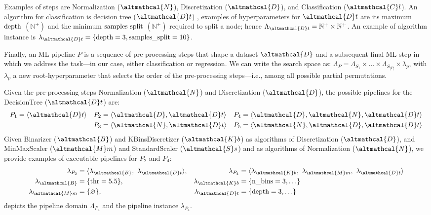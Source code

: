 \begin{example}
    Examples of steps are Normalization ($\altmathcal{N}$), Discretization ($\altmathcal{D}$), and Classification ($\altmathcal{C}l$).
    An algorithm for classification is decision tree  ($\altmathcal{D}t$) \cite{DBLP:books/wa/BreimanFOS84},
    examples of hyperparameters for $\altmathcal{D}t$ are its maximum $\textup{depth}$ $(\mathbb{N}^+)$ and the minimum $\textup{samples split}$ $(\mathbb{N}^+)$ required to split a node; hence $\Lambda_{\altmathcal{D}t} = \mathbb{N}^+ \times \mathbb{N}^+$.
    An example of algorithm instance is $\lambda_{\altmathcal{D}t}= \{ \textup{depth}=3,\textup{samples\_split}=10 \}$.
\end{example}

Finally, an ML pipeline $P$ is a sequence of pre-processing steps that shape a dataset $\altmathcal{D}$ and a subsequent final ML step in which we address the task---in our case, either classification or regression.
We can write the search space as: $\Lambda_P = \Lambda_{S_1} \times \ldots \times \Lambda_{S_{|P|}} \times \lambda_p$, with $\lambda_p$ a new root-hyperparameter that selects the order of the pre-processing steps---i.e., among all possible partial permutations.

\begin{example}[Pipeline]
    Given the pre-processing steps Normalization ($\altmathcal{N}$) and Discretization ($\altmathcal{D}$), the possible pipelines for the DecisionTree ($\altmathcal{D}t$) are:
    \begin{align*}
        P_1 &= \langle \altmathcal{D}t \rangle &
        P_2 &= \langle \altmathcal{D}, \altmathcal{D}t \rangle &
        P_4 &= \langle \altmathcal{D}, \altmathcal{N}, \altmathcal{D}t \rangle \\
        &&
        P_3 &= \langle \altmathcal{N}, \altmathcal{D}t \rangle & P_5 &= \langle \altmathcal{N}, \altmathcal{D}, \altmathcal{D}t \rangle
    \end{align*}
    Given \textup{Binarizer} ($\altmathcal{B}$) and  \textup{KBinsDiscretizer} ($\altmathcal{K}b$) as algorithms of Discretization ($\altmathcal{D}$), and \textup{MinMaxScaler} ($\altmathcal{M}m$) and \textup{StandardScaler} ($\altmathcal{S}s$) and  as algorithms of Normalization ($\altmathcal{N}$), we provide examples of executable pipelines for $P_2$ and $P_4$:
    \begin{align*}
        \lambda_{P_2} &= \langle \lambda_{\altmathcal{B}},~ \lambda_{\altmathcal{D}t} \rangle, &\lambda_{P_4} &= \langle \lambda_{\altmathcal{K}b},~ \lambda_{\altmathcal{M}m},~ \lambda_{\altmathcal{D}t} \rangle \\
        \lambda_{\altmathcal{B}}&=\{ \textup{thr}=5.5 \}, &\lambda_{\altmathcal{K}b}&=\{ \textup{n\_bins}=3, \ldots \}\\
        \lambda_{\altmathcal{M}m}&=\{ \varnothing \}, &\lambda_{\altmathcal{D}t}&= \{ \textup{depth}=3,\ldots\}
    \end{align*}
     depicts the pipeline domain $\Lambda_{P_4}$ and the pipeline instance $\lambda_{P_4}$.
    \label{ex:pipelineinstance}
    \end{example}

